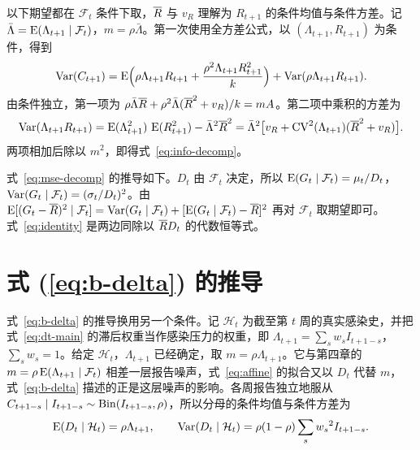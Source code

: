 以下期望都在 $\mathcal F_t$ 条件下取，$\overline{R}$ 与 $v_R$ 理解为 $R_{t+1}$ 的条件均值与条件方差。记 $\bar\Lambda=\operatorname{E}(\Lambda_{t+1}\mid\mathcal F_t)$，$m=\rho\bar\Lambda$。第一次使用全方差公式，以 $(\Lambda_{t+1},R_{t+1})$ 为条件，得到
\begin{equation*}
  \operatorname{Var}(C_{t+1})=\operatorname{E}\Bigl(\rho\Lambda_{t+1}R_{t+1}+\frac{\rho^2\Lambda_{t+1}R_{t+1}^2}{k}\Bigr)+\operatorname{Var}(\rho\Lambda_{t+1}R_{t+1}).
\end{equation*}
由条件独立，第一项为 $\rho\bar\Lambda\overline{R}+\rho^2\bar\Lambda(\overline{R}^2+v_R)/k=mA$。第二项中乘积的方差为
\begin{equation*}
  \operatorname{Var}(\Lambda_{t+1}R_{t+1})=\operatorname{E}(\Lambda_{t+1}^2)\,\operatorname{E}(R_{t+1}^2)-\bar\Lambda^2\overline{R}^2
  =\bar\Lambda^2\bigl[v_R+\operatorname{CV}^2(\Lambda_{t+1})(\overline{R}^2+v_R)\bigr].
\end{equation*}
两项相加后除以 $m^2$，即得式~\eqref{eq:info-decomp}。

式~\eqref{eq:mse-decomp} 的推导如下。$D_t$ 由 $\mathcal F_t$ 决定，所以 $\operatorname{E}(G_t\mid\mathcal F_t)=\mu_t/D_t$，$\operatorname{Var}(G_t\mid\mathcal F_t)=(\sigma_t/D_t)^2$。由 $\operatorname{E}[(G_t-\overline{R})^2\mid\mathcal F_t]=\operatorname{Var}(G_t\mid\mathcal F_t)+[\operatorname{E}(G_t\mid\mathcal F_t)-\overline{R}]^2$ 再对 $\mathcal F_t$ 取期望即可。式~\eqref{eq:identity} 是两边同除以 $\overline{R} D_t$ 的代数恒等式。

\section{\texorpdfstring{式 (\ref{eq:b-delta}) 的推导}{斜率近似式的推导}}
\label{app:b-delta}

式~\eqref{eq:b-delta} 的推导换用另一个条件。记 $\mathcal H_t$ 为截至第 $t$ 周的真实感染史，并把式~\eqref{eq:dt-main} 的滞后权重当作感染压力的权重，即 $\Lambda_{t+1}=\sum_s w_sI_{t+1-s}$，$\sum_s w_s=1$。给定 $\mathcal H_t$，$\Lambda_{t+1}$ 已经确定，取 $m=\rho\Lambda_{t+1}$。它与第四章的 $m=\rho\operatorname{E}(\Lambda_{t+1}\mid\mathcal F_t)$ 相差一层报告噪声，式~\eqref{eq:affine} 的拟合又以 $D_t$ 代替 $m$，式~\eqref{eq:b-delta} 描述的正是这层噪声的影响。各周报告独立地服从 $C_{t+1-s}\mid I_{t+1-s}\sim\operatorname{Bin}(I_{t+1-s},\rho)$，所以分母的条件均值与条件方差为
\begin{equation*}
  \operatorname{E}(D_t\mid\mathcal H_t)=\rho\Lambda_{t+1},\qquad
  \operatorname{Var}(D_t\mid\mathcal H_t)=\rho(1-\rho)\sum_s {w_s}^2I_{t+1-s}.
\end{equation*}

